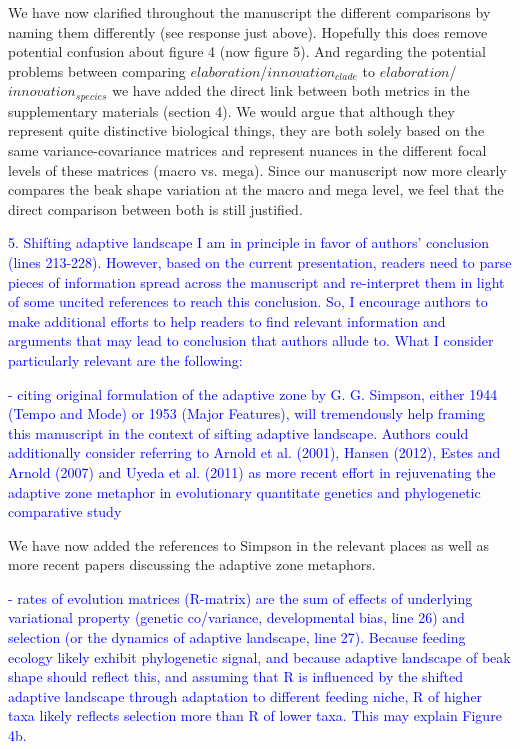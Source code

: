 \documentclass[12pt,letterpaper]{article}
\begin{document}
{We have now clarified throughout the manuscript the different comparisons by naming them differently (see response just above). Hopefully this does remove potential confusion about figure 4 (now figure 5). And regarding the potential problems between comparing $elaboration$/$innovation_{clade}$ to $elaboration$/$innovation_{species}$ we have added the direct link between both metrics in the supplementary materials (section 4). We would argue that although they represent quite distinctive biological things, they are both solely based on the same variance-covariance matrices and represent nuances in the different focal levels of these matrices (macro vs. mega). Since our manuscript now more clearly compares the beak shape variation at the macro and mega level, we feel that the direct comparison between both is still justified.


\textcolor{blue}{5. Shifting adaptive landscape
I am in principle in favor of authors’ conclusion (lines 213-228). However, based on the current presentation, readers need to parse pieces of information spread across the manuscript and re-interpret them in light of some uncited references to reach this conclusion. So, I encourage authors to make additional efforts to help readers to find relevant information and arguments that may lead to conclusion that authors allude to. What I consider particularly relevant are the following:}

\textcolor{blue}{- citing original formulation of the adaptive zone by G. G. Simpson, either 1944 (Tempo and Mode) or 1953 (Major Features), will tremendously help framing this manuscript in the context of sifting adaptive landscape. Authors could additionally consider referring to Arnold et al. (2001), Hansen (2012), Estes and Arnold (2007) and Uyeda et al. (2011) as more recent effort in rejuvenating the adaptive zone metaphor in evolutionary quantitate genetics and phylogenetic comparative study}

We have now added the references to Simpson in the relevant places as well as more recent papers discussing the adaptive zone metaphors.

\textcolor{blue}{- rates of evolution matrices (R-matrix) are the sum of effects of underlying variational property (genetic co/variance, developmental bias, line 26) and selection (or the dynamics of adaptive landscape, line 27). Because feeding ecology likely exhibit phylogenetic signal, and because adaptive landscape of beak shape should reflect this, and assuming that R is influenced by the shifted adaptive landscape through adaptation to different feeding niche, R of higher taxa likely reflects selection more than R of lower taxa. This may explain Figure 4b.}

}
\end{document}
